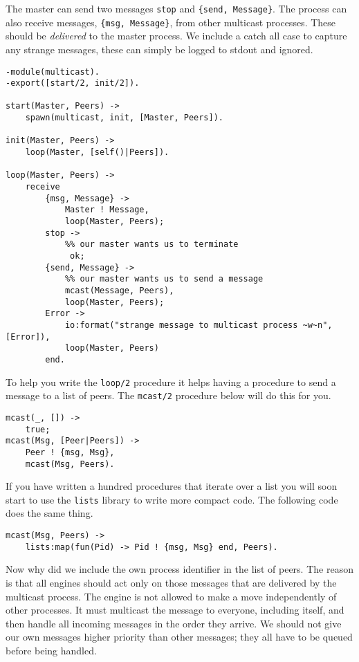 \documentclass[a4paper,11pt]{article}
\begin{document}
The master can send two messages {\tt stop} and {\tt \{send,
Message\}}. The process can also receive messages, {\tt \{msg,
Message\}}, from other multicast processes. These should be {\it
delivered} to the master process. We include a catch all case to
capture any strange messages, these can simply be logged to stdout and
ignored.

\begin{verbatim}
-module(multicast).
-export([start/2, init/2]).

start(Master, Peers) ->
    spawn(multicast, init, [Master, Peers]).

init(Master, Peers) ->
    loop(Master, [self()|Peers]).

loop(Master, Peers) ->
    receive
        {msg, Message} ->
            Master ! Message,
            loop(Master, Peers);
        stop ->
            %% our master wants us to terminate
             ok;
        {send, Message} ->
            %% our master wants us to send a message
            mcast(Message, Peers),
            loop(Master, Peers);
        Error ->
            io:format("strange message to multicast process ~w~n", [Error]),
            loop(Master, Peers)
        end.
\end{verbatim}

To help you write the {\tt loop/2} procedure it helps having a
procedure to send a message to a list of peers. The {\tt mcast/2}
procedure below will do this for you. 

\begin{verbatim}
mcast(_, []) ->
    true;
mcast(Msg, [Peer|Peers]) ->
    Peer ! {msg, Msg},
    mcast(Msg, Peers).
\end{verbatim}

If you have written a hundred procedures that iterate over a list you
will soon start to use the {\tt lists} library to write more compact
code. The following code does the same thing.

\begin{verbatim}
mcast(Msg, Peers) ->
    lists:map(fun(Pid) -> Pid ! {msg, Msg} end, Peers).
\end{verbatim}

Now why did we include the own process identifier in the list of
peers. The reason is that all engines should act only on those
messages that are delivered by the multicast process. The engine is
not allowed to make a move independently of other processes. It must
multicast the message to everyone, including itself, and then handle
all incoming messages in the order they arrive. We should not give our
own messages higher priority than other messages; they all have to be
queued before being handled.
\end{document}
